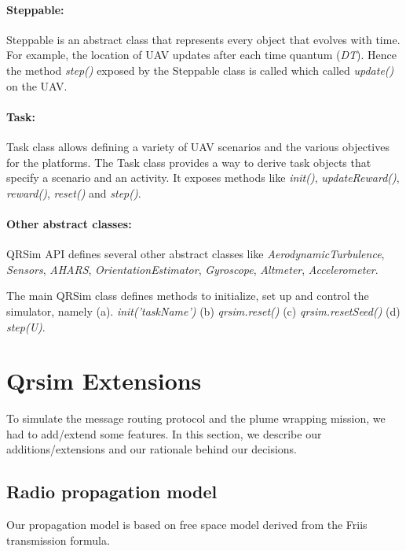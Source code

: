 \paragraph{Steppable:} Steppable is an abstract class that represents every object that evolves with time. For example, the location of UAV updates after each time quantum (\emph{DT}). Hence the method \emph{step()} exposed by the Steppable class is called which called \emph{update()} on the UAV.
\paragraph{Task:}
Task class allows defining a variety of UAV scenarios and the various objectives for the platforms. The Task class provides a way to derive task objects that specify a scenario and an activity. It exposes methods like \emph{init()}, \emph{updateReward()}, \emph{reward()}, \emph{reset()} and \emph{step()}.
\paragraph{Other abstract classes:}
QRSim API defines several other abstract classes like \emph{AerodynamicTurbulence}, \emph{Sensors}, \emph{AHARS}, \emph{OrientationEstimator}, \emph{Gyroscope}, \emph{Altmeter}, \emph{Accelerometer}.

The main QRSim class defines methods to initialize, set up and control the simulator, namely (a). \emph{init('taskName')} (b) \emph{qrsim.reset()} (c) \emph{qrsim.resetSeed()} (d) \emph{step(U)}.

\section{Qrsim Extensions}

To simulate the message routing protocol and the plume wrapping mission, we had to add/extend some features. In this section, we describe our additions/extensions and our rationale behind our decisions.

\subsection{Radio propagation model} \label{free_space_path_loss}
Our propagation model is based on free space model derived from the Friis transmission formula. \cite{5735774}

